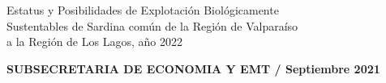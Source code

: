 \documentclass[12pt, oneside]{article} %
\begin{document}
\begin{titlepage}
\begin{minipage}{\textwidth}
{            \centering \fontsize{9pt}{8pt}\selectfont
            \vspace*{-5mm} 
            \hfill \begin{flushright}
            Estatus y Posibilidades de Explotación Biológicamente \\ Sustentables de Sardina común de la  Región de Valparaíso \\ a la Región de Los Lagos, año 2022
			\end{flushright} 
              
			\centering \fontsize{10pt}{8pt}\selectfont
            \vspace*{2mm} 
            \hfill \textbf{SUBSECRETARIA DE ECONOMIA Y EMT / Septiembre 2021}
                        
            \vspace*{0.2cm}
        }
    \end{minipage}

\end{titlepage}
\endgroup
\end{document}
